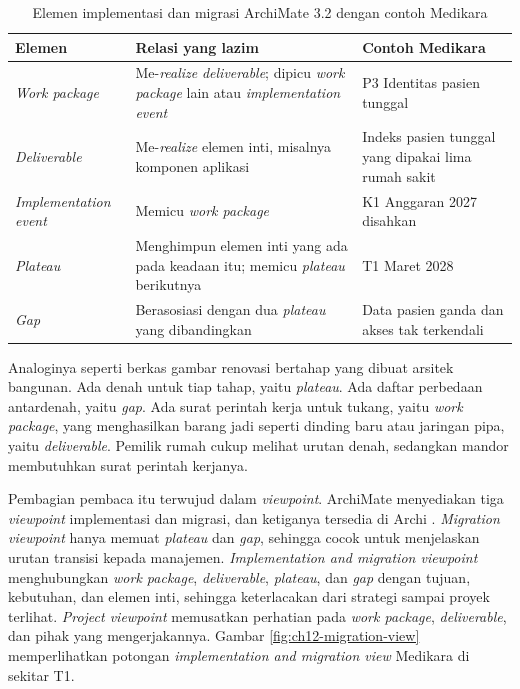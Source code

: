\begin{table}[!htb]
  \centering
  \caption{Elemen implementasi dan migrasi ArchiMate 3.2 dengan contoh Medikara}
  \label{tab:ch12-elemen}
  \begin{tabularx}{\textwidth}{>{\raggedright\arraybackslash}p{2.6cm}
                               >{\raggedright\arraybackslash}X
                               >{\raggedright\arraybackslash}X}
    \hline
    \textbf{Elemen} & \textbf{Relasi yang lazim} & \textbf{Contoh Medikara} \\
    \hline
    \textit{Work package} & Me-\textit{realize} \textit{deliverable}; dipicu
      \textit{work package} lain atau \textit{implementation event} & P3
      Identitas pasien tunggal \\
    \hline
    \textit{Deliverable} & Me-\textit{realize} elemen inti, misalnya komponen
      aplikasi & Indeks pasien tunggal yang dipakai lima rumah sakit \\
    \hline
    \textit{Implementation event} & Memicu \textit{work package} & K1 Anggaran
      2027 disahkan \\
    \hline
    \textit{Plateau} & Menghimpun elemen inti yang ada pada keadaan itu; memicu
      \textit{plateau} berikutnya & T1 Maret 2028 \\
    \hline
    \textit{Gap} & Berasosiasi dengan dua \textit{plateau} yang dibandingkan &
      Data pasien ganda dan akses tak terkendali \\
    \hline
  \end{tabularx}
\end{table}

Analoginya seperti berkas gambar renovasi bertahap yang dibuat arsitek
bangunan. Ada denah untuk tiap tahap, yaitu \textit{plateau}. Ada daftar
perbedaan antardenah, yaitu \textit{gap}. Ada surat perintah kerja untuk
tukang, yaitu \textit{work package}, yang menghasilkan barang jadi seperti
dinding baru atau jaringan pipa, yaitu \textit{deliverable}. Pemilik rumah
cukup melihat urutan denah, sedangkan mandor membutuhkan surat perintah
kerjanya.

Pembagian pembaca itu terwujud dalam \textit{viewpoint}. ArchiMate menyediakan
tiga \textit{viewpoint} implementasi dan migrasi, dan ketiganya tersedia di
Archi \cite{archimate32,archi}. \textit{Migration viewpoint} hanya memuat
\textit{plateau} dan \textit{gap}, sehingga cocok untuk menjelaskan urutan
transisi kepada manajemen. \textit{Implementation and migration viewpoint}
menghubungkan \textit{work package}, \textit{deliverable}, \textit{plateau},
dan \textit{gap} dengan tujuan, kebutuhan, dan elemen inti, sehingga
keterlacakan dari strategi sampai proyek terlihat. \textit{Project viewpoint}
memusatkan perhatian pada \textit{work package}, \textit{deliverable}, dan
pihak yang mengerjakannya. Gambar \ref{fig:ch12-migration-view} memperlihatkan
potongan \textit{implementation and migration view} Medikara di sekitar T1.

